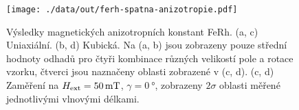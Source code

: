 \begin{figure}[htbp]
    \centering
    \texttt{[image: ./data/out/ferh-spatna-anizotropie.pdf]}
    \caption{Výsledky magnetických anizotropních konstant FeRh. (a, c) Uniaxiální. (b, d) Kubická. Na (a, b) jsou zobrazeny pouze střední hodnoty odhadů pro čtyři kombinace různých velikostí pole a rotace vzorku, čtverci jsou naznačeny oblasti zobrazené v (c, d). (c, d) Zaměření na $H_\textrm{ext}=\SI{50}{\milli\tesla}$, $\gamma=\SI{0}{\degree}$, zobrazeny $2\sigma$ oblasti měřené jednotlivými vlnovými délkami.}
    \label{fig:ferh-anizotropie}
\end{figure}
